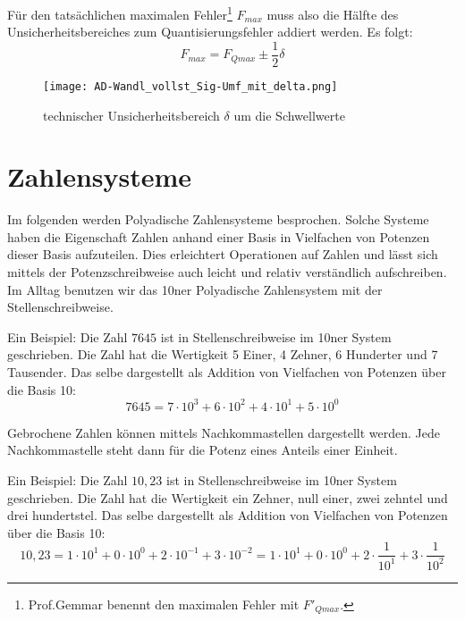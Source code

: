 Für den tatsächlichen maximalen Fehler\footnote{Prof.Gemmar benennt den maximalen Fehler mit $F'_{Qmax}$.} $F_{max}$ muss also die Hälfte des Unsicherheitsbereiches zum Quantisierungsfehler addiert werden. Es folgt:
\[
	F_{max} = F_{Qmax} \pm \frac{1}{2} \delta
\]

\begin{figure}[htbp] %
	\centering
	\texttt{[image: AD-Wandl\_vollst\_Sig-Umf\_mit\_delta.png]}
	\caption{technischer Unsicherheitsbereich $\delta$ um die Schwellwerte}
	\label{AD-Wandl_vollst_Sig-Umf_mit_delta}
\end{figure}


\chapter{Zahlensysteme}
Im folgenden werden Polyadische Zahlensysteme besprochen. Solche Systeme haben die Eigenschaft Zahlen anhand einer Basis in Vielfachen von Potenzen dieser Basis aufzuteilen. Dies erleichtert Operationen auf Zahlen und lässt sich mittels der Potenzschreibweise auch leicht und relativ verständlich aufschreiben. Im Alltag benutzen wir das 10ner Polyadische Zahlensystem mit der Stellenschreibweise.

Ein Beispiel: Die Zahl $7645$ ist in Stellenschreibweise im 10ner System geschrieben. Die Zahl hat die Wertigkeit 5 Einer, 4 Zehner, 6 Hunderter und 7 Tausender. Das selbe dargestellt als Addition von Vielfachen von Potenzen über die Basis 10:
\[
	7645 = 7 \cdot 10^3 + 6 \cdot 10^2 + 4 \cdot 10^1 + 5 \cdot 10^0
\]

Gebrochene Zahlen können mittels Nachkommastellen dargestellt werden. Jede Nachkommastelle steht dann für die Potenz eines Anteils einer Einheit.

Ein Beispiel: Die Zahl $10,23$ ist in Stellenschreibweise im 10ner System geschrieben. Die Zahl hat die Wertigkeit ein Zehner, null einer, zwei zehntel und drei hundertstel. Das selbe dargestellt als Addition von Vielfachen von Potenzen über die Basis 10:
\[
	10,23 = 1 \cdot 10^1 + 0 \cdot 10^0 + 2 \cdot 10^{-1} + 3 \cdot 10^{-2} 
	= 1 \cdot 10^1 + 0 \cdot 10^0 + 2 \cdot \frac{1}{10^1} + 3 \cdot  \frac{1}{10^2}
\]

